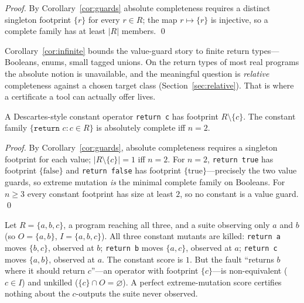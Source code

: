 \documentclass[runningheads,envcountsect,envcountsame]{llncs}
\begin{document}
\begin{proof}
By Corollary~\ref{cor:guards} absolute completeness requires a distinct singleton
footprint $\{r\}$ for every $r \in R$; the map $r \mapsto \{r\}$ is injective, so
a complete family has at least $|R|$ members. \qed
\end{proof}

Corollary~\ref{cor:infinite} bounds the value-guard story to finite return
types---Booleans, enums, small tagged unions. On the return types of most real
programs the absolute notion is unavailable, and the meaningful question is
\emph{relative} completeness against a chosen target class
(Section~\ref{sec:relative}). That is where a certificate a tool can actually
offer lives.

\begin{corollary}
\label{cor:constants}
A Descartes-style constant operator \texttt{return c} has footprint
$R \setminus \{c\}$. The constant family $\{\texttt{return } c : c \in R\}$ is
absolutely complete iff $n = 2$.
\end{corollary}

\begin{proof}
By Corollary~\ref{cor:guards}, absolute completeness requires a singleton
footprint for each value; $|R \setminus \{c\}| = 1$ iff $n = 2$. For $n = 2$,
\texttt{return true} has footprint $\{\mathrm{false}\}$ and \texttt{return false}
has footprint $\{\mathrm{true}\}$---precisely the two value guards, so extreme
mutation \emph{is} the minimal complete family on Booleans. For $n \ge 3$ every
constant footprint has size at least $2$, so no constant is a value guard. \qed
\end{proof}

\begin{example}
\label{ex:miss}
Let $R = \{a,b,c\}$, a program reaching all three, and a suite observing only $a$
and $b$ (so $O = \{a,b\}$, $I = \{a,b,c\}$). All three constant mutants are
killed: \texttt{return a} moves $\{b,c\}$, observed at $b$; \texttt{return b}
moves $\{a,c\}$, observed at $a$; \texttt{return c} moves $\{a,b\}$, observed at
$a$. The constant score is $1$. But the fault ``returns $b$ where it should
return $c$''---an operator with footprint $\{c\}$---is non-equivalent ($c \in I$)
and unkilled ($\{c\} \cap O = \varnothing$). A perfect extreme-mutation score
certifies nothing about the $c$-outputs the suite never observed.
\end{example}
\end{document}
